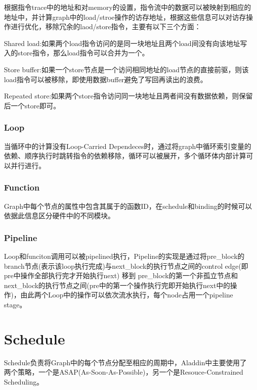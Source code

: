 \documentclass[UTF8]{scrartcl}
\begin{document}
			根据指令trace中的地址和对memory的设置，指令流中的数据可以被映射到相应的地址中，并计算graph中的load/stroe操作的访存地址，根据这些信息可以对访存操作进行优化，移除冗余的laod/store指令，主要有以下三个方面：
			
			Shared load:如果两个load指令访问的是同一块地址且两个load间没有向该地址写入的store指令，那么load指令可以合并为一个。
			
			Store buffer:如果一个store节点是一个访问相同地址的load节点的直接前驱，则该load指令可以被移除，即使用数据buffer避免了写回再读出的浪费。
			
			Repeated store:如果两个store指令访问同一块地址且两者间没有数据依赖，则保留后一个store即可。
			
		\subsubsection{Loop}
		
			当循环中的计算没有Loop-Carried Dependeces时，通过将graph中循环索引变量的依赖、顺序执行时跳转指令的依赖移除，循环可以被展开，多个循环体内部计算可以并行进行。
		
		\subsubsection{Function}
			
			Graph中每个节点的属性中包含其属于的函数ID，在schedule和binding的时候可以依据此信息区分硬件中的不同模块。
					
		\subsubsection{Pipeline}
		
			Loop和funciton调用可以被pipelined执行，Pipeline的实现是通过将pre\_block的branch节点(表示该loop执行完成)与next\_block的执行节点之间的control edge(即pre中操作全部执行完才开始执行next) 移到 pre\_block的第一个非孤立节点和next\_block的执行节点之间(pre中的第一个操作执行完即开始执行next中的操作)，由此两个Loop中的操作可以依次流水执行，每个node占用一个pipeline stage。
			
	
	
\section{Schedule}

	Schedule负责将Graph中的每个节点分配至相应的周期中，Aladdin中主要使用了两个策略，一个是ASAP(As-Soon-As-Possible)，另一个是Resouce-Constrained Scheduling。
		
\end{document}
